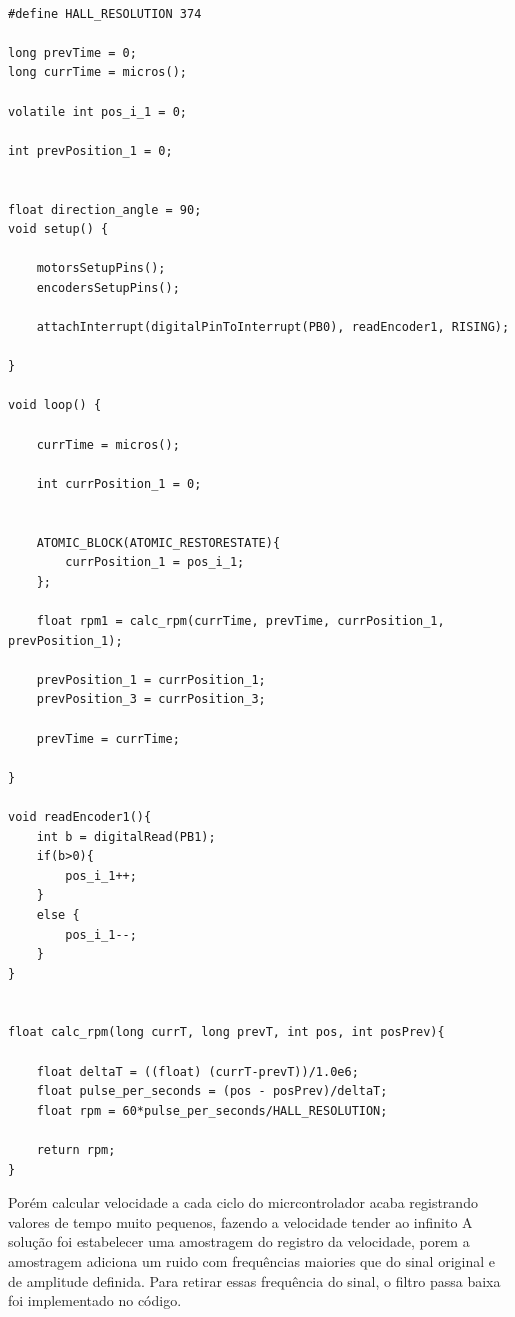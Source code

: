 \lstset{language=C}
\begin{lstlisting}

#define HALL_RESOLUTION 374

long prevTime = 0;
long currTime = micros();

volatile int pos_i_1 = 0;

int prevPosition_1 = 0;


float direction_angle = 90;
void setup() {

    motorsSetupPins();
    encodersSetupPins();

    attachInterrupt(digitalPinToInterrupt(PB0), readEncoder1, RISING);
    
}

void loop() {

	currTime = micros();

	int currPosition_1 = 0;


	ATOMIC_BLOCK(ATOMIC_RESTORESTATE){
		currPosition_1 = pos_i_1;
	};
	
	float rpm1 = calc_rpm(currTime, prevTime, currPosition_1, prevPosition_1);

	prevPosition_1 = currPosition_1;
	prevPosition_3 = currPosition_3;

	prevTime = currTime;  

}

void readEncoder1(){ 
    int b = digitalRead(PB1);
    if(b>0){
        pos_i_1++;
    }
    else {
        pos_i_1--;
    }
}


float calc_rpm(long currT, long prevT, int pos, int posPrev){

    float deltaT = ((float) (currT-prevT))/1.0e6;
    float pulse_per_seconds = (pos - posPrev)/deltaT;
    float rpm = 60*pulse_per_seconds/HALL_RESOLUTION;

    return rpm;
}

\end{lstlisting}


Porém calcular velocidade a cada ciclo do micrcontrolador acaba registrando valores de tempo muito pequenos, fazendo a velocidade tender ao infinito
A solução foi estabelecer uma amostragem do registro da velocidade, porem a amostragem adiciona um ruido com frequências maiories que do sinal original e de amplitude definida.
Para retirar essas frequência do sinal, o filtro passa baixa foi implementado no código.



